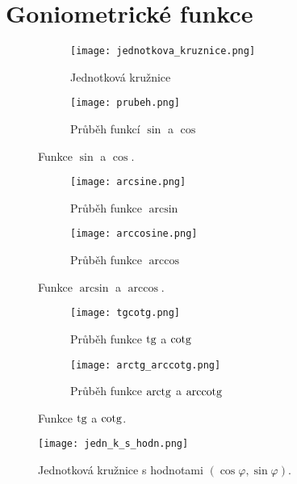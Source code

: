 \appendix
\section{Goniometrické funkce}\label{appa}

\begin{figure}[ht!]
     \centering
     \begin{subfigure}{0.26\textwidth}
         \centering
         \texttt{[image: jednotkova\_kruznice.png]}
         \caption{Jednotková kružnice}
     \end{subfigure}
     \begin{subfigure}{0.65\textwidth}
         \centering
         \texttt{[image: prubeh.png]}
         \caption{Průběh funkcí $\sin$ a $\cos$}
     \end{subfigure}
     \caption{Funkce $\sin$ a $\cos$.}
\end{figure}

\begin{figure}[ht!]
     \centering
     \begin{subfigure}{0.49\textwidth}
         \centering
         \texttt{[image: arcsine.png]}
         \caption{Průběh funkce $\arcsin$}
     \end{subfigure}
     \begin{subfigure}{0.49\textwidth}
         \centering
         \texttt{[image: arccosine.png]}
         \caption{Průběh funkce $\arccos$}
     \end{subfigure}
     \caption{Funkce $\arcsin$ a $\arccos$.}
\end{figure}

\begin{figure}[ht!]
     \centering
     \begin{subfigure}{0.49\textwidth}
         \centering
         \texttt{[image: tgcotg.png]}
         \caption{Průběh funkce $\operatorname{tg}$ a $\operatorname{cotg}$}
     \end{subfigure}
     \begin{subfigure}{0.49\textwidth}
         \centering
         \texttt{[image: arctg\_arccotg.png]}
         \caption{Průběh funkce $\operatorname{arctg}$ a $\operatorname{arccotg}$}
     \end{subfigure}
     \caption{Funkce $\operatorname{tg}$ a $\operatorname{cotg}$.}
\end{figure}

\begin{figure}[ht!]
     \centering
     \texttt{[image: jedn\_k\_s\_hodn.png]}
     \caption{Jednotková kružnice s hodnotami $(\cos \varphi, \sin \varphi).$}
     \label{kruzsh}
\end{figure}

